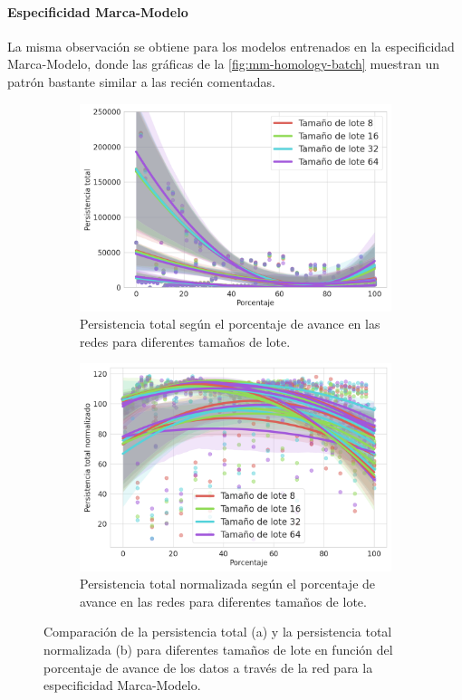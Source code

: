 \paragraph{Especificidad Marca-Modelo}

La misma observación se obtiene para los modelos entrenados en la especificidad
Marca-Modelo, donde las gráficas de la \autoref{fig:mm-homology-batch} muestran un
patrón bastante similar a las recién comentadas.

\begin{figure}[H]
	\centering
	\begin{subfigure}
		{.5\textwidth}
		\centering
		\includegraphics[width=\linewidth]{img/mm_batch.png}
		\caption{Persistencia total según el porcentaje de avance en las redes para
			diferentes tamaños de lote.}
		\label{fig:mm-homology-batch-1}
	\end{subfigure}%
	\begin{subfigure}
		{.5\textwidth}
		\centering
		\includegraphics[width=\linewidth]{img/mm_batch_norm.png}
		\caption{Persistencia total normalizada según el porcentaje de avance en las
			redes para diferentes tamaños de lote.}
		\label{fig:mm-homology-batch-2}
	\end{subfigure}
	\caption{Comparación de la persistencia total (a) y la persistencia total
		normalizada (b) para diferentes tamaños de lote en función del porcentaje de
		avance de los datos a través de la red para la especificidad Marca-Modelo.}
	\label{fig:mm-homology-batch}
\end{figure}

